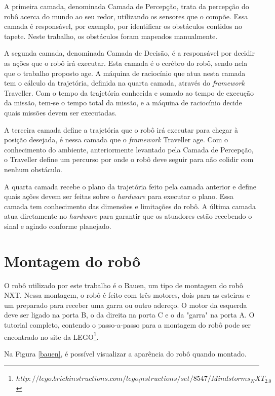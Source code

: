 A primeira camada, denominada Camada de Percepção, trata da percepção do robô acerca do mundo ao seu redor, utilizando os sensores que o compõe. Essa camada é responsável, por exemplo, por identificar os obstáculos contidos no tapete. Neste trabalho, os obstáculos foram mapeados manualmente.

A segunda camada, denominada Camada de Decisão, é a responsável por decidir as ações que o robô irá executar. Esta camada é o cerébro do robô, sendo nela que o trabalho proposto age. A máquina de raciocínio que atua nesta camada tem o cálculo da trajetória, definida na 	quarta camada, através do \textit{framework} Traveller. Com o tempo da trajetória conhecida e somado ao tempo de execução da missão, tem-se o tempo total da missão, e a máquina de raciocínio decide quais missões devem ser executadas.

A terceira camada define a trajetória que o robô irá executar para chegar à posição desejada, é nessa camada que o \textit{framework} Traveller age. Com o conhecimento do ambiente, anteriormente levantado pela Camada de Percepção, o Traveller define um percurso por onde o robô deve seguir para não colidir com nenhum obstáculo.

A quarta camada recebe o plano da trajetória feito pela camada anterior e define quais ações devem ser feitas sobre o \textit{hardware} para executar o plano. Essa camada tem conhecimento das dimensões e limitações do robô. A última camada atua diretamente no \textit{hardware} para garantir que os atuadores estão recebendo o sinal e agindo conforme planejado.
 
\section{Montagem do robô}
O robô utilizado por este trabalho é o Bauen, um tipo de montagem do robô NXT. Nessa montagem, o robô é feito com três motores, dois para as esteiras e um preparado para receber uma garra ou outro adereço. O motor da esquerda deve ser ligado na porta B, o da direita na porta C e o da "garra" na porta A. O tutorial completo, contendo o passo-a-passo para a montagem do robô pode ser encontrado no site da LEGO\footnote{$http://lego.brickinstructions.com/lego_instructions/set/8547/Mindstorms_NXT_2.0$}. 

Na Figura \ref{bauen}, é possível visualizar a aparência do robô quando montado. 

